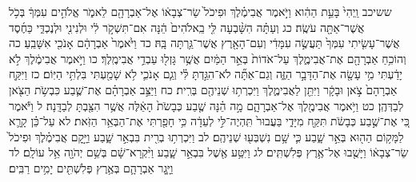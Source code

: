 \documentclass[twoside, openany, parskip=half, 11pt]{book}
\begin{document}
ששיכב וַֽיְהִי֙ בָּעֵ֣ת הַהִ֔וא וַיֹּ֣אמֶר אֲבִימֶ֗לֶךְ וּפִיכֹל֙ שַׂר־צְבָא֔וֹ אֶל־אַבְרָהָ֖ם לֵאמֹ֑ר אֱלֹהִ֣ים עִמְּךָ֔ בְּכֹ֥ל אֲשֶׁר־אַתָּ֖ה עֹשֶֽׂה׃ כג וְעַתָּ֗ה הִשָּׁ֨בְעָה לִּ֤י בֵֽאלֹהִים֙ הֵ֔נָּה אִם־תִּשְׁקֹ֣ר לִ֔י וּלְנִינִ֖י וּלְנֶכְדִּ֑י כַּחֶ֜סֶד אֲשֶׁר־עָשִׂ֤יתִי עִמְּךָ֙ תַּעֲשֶׂ֣ה עִמָּדִ֔י וְעִם־הָאָ֖רֶץ אֲשֶׁר־גַּ֥רְתָּה בָּֽהּ׃ כד וַיֹּ֙אמֶר֙ אַבְרָהָ֔ם אָנֹכִ֖י אִשָּׁבֵֽעַ׃ כה וְהוֹכִ֥חַ אַבְרָהָ֖ם אֶת־אֲבִימֶ֑לֶךְ עַל־אֹדוֹת֙ בְּאֵ֣ר הַמַּ֔יִם אֲשֶׁ֥ר גָּזְל֖וּ עַבְדֵ֥י אֲבִימֶֽלֶךְ׃ כו וַיֹּ֣אמֶר אֲבִימֶ֔לֶךְ לֹ֣א יָדַ֔עְתִּי מִ֥י עָשָׂ֖ה אֶת־הַדָּבָ֣ר הַזֶּ֑ה וְגַם־אַתָּ֞ה לֹא־הִגַּ֣דְתָּ לִּ֗י וְגַ֧ם אָנֹכִ֛י לֹ֥א שָׁמַ֖עְתִּי בִּלְתִּ֥י הַיּֽוֹם׃ כז וַיִּקַּ֤ח אַבְרָהָם֙ צֹ֣אן וּבָקָ֔ר וַיִּתֵּ֖ן לַאֲבִימֶ֑לֶךְ וַיִּכְרְת֥וּ שְׁנֵיהֶ֖ם בְּרִֽית׃ כח וַיַּצֵּ֣ב אַבְרָהָ֗ם אֶת־שֶׁ֛בַע כִּבְשֹׂ֥ת הַצֹּ֖אן לְבַדְּהֶֽן׃ כט וַיֹּ֥אמֶר אֲבִימֶ֖לֶךְ אֶל־אַבְרָהָ֑ם מָ֣ה הֵ֗נָּה שֶׁ֤בַע כְּבָשֹׂת֙ הָאֵ֔לֶּה אֲשֶׁ֥ר הִצַּ֖בְתָּ לְבַדָּֽנָה׃ ל וַיֹּ֕אמֶר כִּ֚י אֶת־שֶׁ֣בַע כְּבָשֹׂ֔ת תִּקַּ֖ח מִיָּדִ֑י בַּעֲבוּר֙ תִּֽהְיֶה־לִּ֣י לְעֵדָ֔ה כִּ֥י חָפַ֖רְתִּי אֶת־הַבְּאֵ֥ר הַזֹּֽאת׃ לא עַל־כֵּ֗ן קָרָ֛א לַמָּק֥וֹם הַה֖וּא בְּאֵ֣ר שָׁ֑בַע כִּ֛י שָׁ֥ם נִשְׁבְּע֖וּ שְׁנֵיהֶֽם׃ לב וַיִּכְרְת֥וּ בְרִ֖ית בִּבְאֵ֣ר שָׁ֑בַע וַיָּ֣קׇם אֲבִימֶ֗לֶךְ וּפִיכֹל֙ שַׂר־צְבָא֔וֹ וַיָּשֻׁ֖בוּ אֶל־אֶ֥רֶץ פְּלִשְׁתִּֽים׃ לג וַיִּטַּ֥ע אֶ֖שֶׁל בִּבְאֵ֣ר שָׁ֑בַע וַיִּ֨קְרָא־שָׁ֔ם בְּשֵׁ֥ם יְהֹוָ֖ה אֵ֥ל עוֹלָֽם׃ לד וַיָּ֧גׇר אַבְרָהָ֛ם בְּאֶ֥רֶץ פְּלִשְׁתִּ֖ים יָמִ֥ים רַבִּֽים׃
\end{document}
